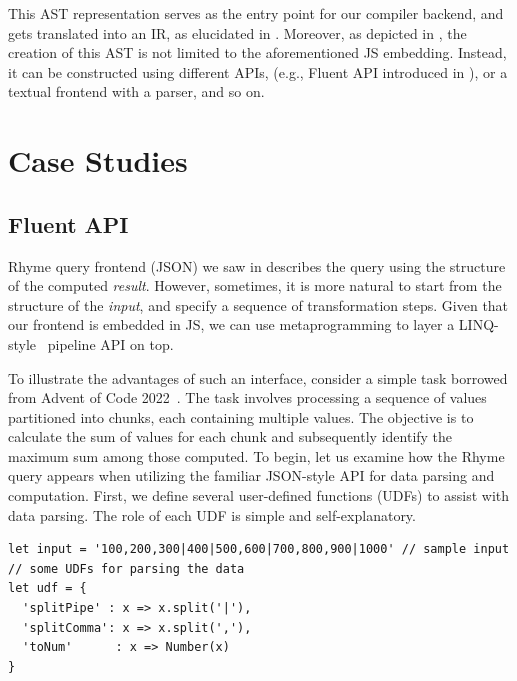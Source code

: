 \documentclass[runningheads]{llncs}
\newcommand{\lang}{Rhyme}
\begin{document}
This AST representation serves as the entry point for our compiler backend, and gets
translated into an IR, as elucidated in .
Moreover, as depicted in , the creation of this AST is not
limited to the aforementioned JS embedding.
Instead, it can be constructed using different APIs, (e.g., Fluent API introduced in ),
or a textual frontend with a parser, and so on.

\vspace{-4mm}
\section{Case Studies}\label{sec:case_studies}
\vspace{-3mm}
\subsection{Fluent API}\label{subsec:fluent}
\vspace{-2mm}
\lang{} query frontend (JSON) we saw in  describes the query
using the structure of the computed \emph{result}.
However, sometimes, it is more natural to start from the structure of the 
\emph{input}, and specify a sequence of transformation steps.
Given that our frontend is embedded in JS, we can use metaprogramming to
layer a LINQ-style~\cite{linq_sigmod} pipeline API on top.

To illustrate the advantages of such an interface, consider a
simple task borrowed from Advent of Code 2022~\cite{adventofcode22}.
The task involves processing a sequence of values partitioned into chunks,
each containing multiple values.
The objective is to calculate the sum of values for each chunk and
subsequently identify the maximum sum among those computed.
To begin, let us examine how the \lang{} query appears when utilizing
the familiar JSON-style API for data parsing and computation.
First, we define several user-defined functions (UDFs) to assist with data parsing.
The role of each UDF is simple and self-explanatory.

\begin{lstlisting}[style=JavaScript, columns=flexible]
let input = '100,200,300|400|500,600|700,800,900|1000' // sample input
// some UDFs for parsing the data
let udf = {
  'splitPipe' : x => x.split('|'),
  'splitComma': x => x.split(','),
  'toNum'      : x => Number(x)
}
\end{lstlisting}
\end{document}
